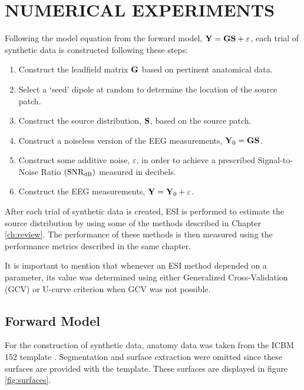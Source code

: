 \chapter{NUMERICAL EXPERIMENTS}
\label{ch:numeric}


Following the model equation from the forward model,
$\mathbf{Y} = \mathbf{G} \mathbf{S} + \varepsilon$,
each trial of synthetic data is constructed following these steps:
\begin{enumerate}
    \item Construct the leadfield matrix $\mathbf{G}$ based on pertinent anatomical data.
    \item Select a `seed' dipole at random to determine the location of the source patch.
    \item Construct the source distribution, $\mathbf{S}$, based on the source patch.
    \item Construct a noiseless version of the EEG measurements, $\mathbf{Y}_0 = \mathbf{G} \mathbf{S}$.
    \item Construct some additive noise, $\varepsilon$, in order to achieve a prescribed Signal-to-Noise Ratio $\left( \text{SNR}_\text{dB} \right)$ measured in decibels.
    \item Construct the EEG measurements, $\mathbf{Y} = \mathbf{Y}_0 + \varepsilon$.
\end{enumerate}

After each trial of synthetic data is created, ESI is performed to estimate the source distribution by using some of the methods described in Chapter \ref{ch:review}.
%
The performance of these methods is then measured using the performance metrics described in the same chapter.

It is important to mention that whenever an ESI method depended on a parameter, its value was determined using either Generalized Cross-Validation (GCV) or U-curve criterion when GCV was not possible.

\section{Forward Model}

For the construction of synthetic data, anatomy data was taken from the ICBM 152 template \cite{icbm152_2011}. 
%
%
Segmentation and surface extraction were omitted since these surfaces are provided with the template.
%
These surfaces are displayed in figure \ref{fig:surfaces}.

